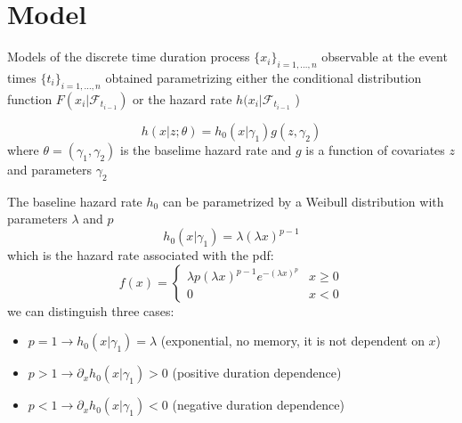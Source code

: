 \section{Model}
Models of the discrete time duration process $\{x_i\}_{i=1,\ldots,n}$ observable at the event times $\{t_i\}_{i=1,\ldots,n}$ obtained parametrizing either the conditional distribution function $F(x_i|\mathcal{F}_{t_{i-1}})$ or the hazard rate $h(x_i|\mathcal{F}_{t_{i-1}}$
)
\begin{mytheorem}
	\[h(x|z;\theta) = h_0(x|\gamma_1)g(z,\gamma_2)\]
where $\theta = (\gamma_1,\gamma_2)$ is the baselime hazard rate and $g$ is a function of covariates $z$ and parameters $\gamma_2$
\end{mytheorem}
The baseline hazard rate $h_0$ can be parametrized by a Weibull distribution with parameters $\lambda$ and $p$
\[
h_0(x|\gamma_1) = \lambda(\lambda x)^{p-1}
\]
which is the hazard rate associated with the pdf:
\[
f(x) = \begin{cases}
	\lambda p(\lambda x)^{p-1} e^{- (\lambda x)^p} & x\geq 0\\
	0 & x<0
\end{cases}
\]
we can distinguish three cases:
\begin{itemize}
	\item $p=1 \to h_0(x|\gamma_1) = \lambda$ (exponential, no memory, it is not dependent on $x$)
	\item $p>1 \to \partial_x h_0(x|\gamma_1) >0$ (positive duration dependence)
	\item $p<1 \to \partial_x h_0 (x|\gamma_1) <0$ (negative duration dependence)
\end{itemize}
